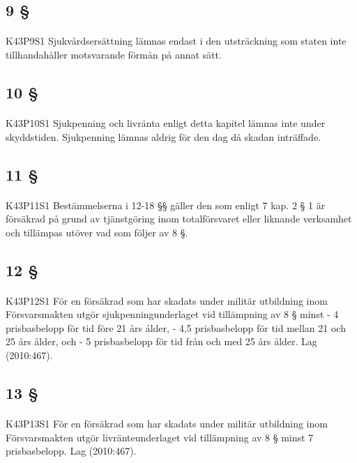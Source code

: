\documentclass[a4paper,notitlepage,openany,10pt]{book}
\begin{document}
\subsection*{9 §}
\paragraph*{}
{\tiny K43P9S1}
Sjukvårdsersättning lämnas endast i den utsträckning som staten inte tillhandahåller motsvarande förmån på annat sätt.
\subsection*{10 §}
\paragraph*{}
{\tiny K43P10S1}
Sjukpenning och livränta enligt detta kapitel lämnas inte under skyddstiden. Sjukpenning lämnas aldrig för den dag då skadan inträffade.
\subsection*{11 §}
\paragraph*{}
{\tiny K43P11S1}
Bestämmelserna i 12-18 §§ gäller den som enligt 7 kap. 2 § 1 är försäkrad på grund av tjänstgöring inom totalförsvaret eller liknande verksamhet och tillämpas utöver vad som följer av 8 §.
\subsection*{12 §}
\paragraph*{}
{\tiny K43P12S1}
För en försäkrad som har skadats under militär utbildning inom Försvarsmakten utgör sjukpenningunderlaget vid tillämpning av 8 § minst
\newline - 4 prisbasbelopp för tid före 21 års ålder,
\newline - 4,5 prisbasbelopp för tid mellan 21 och 25 års ålder, och
\newline - 5 prisbasbelopp för tid från och med 25 års ålder.
Lag (2010:467).
\subsection*{13 §}
\paragraph*{}
{\tiny K43P13S1}
För en försäkrad som har skadats under militär utbildning inom Försvarsmakten utgör livränteunderlaget vid tillämpning av 8 § minst 7 prisbasbelopp.
Lag (2010:467).
\end{document}
